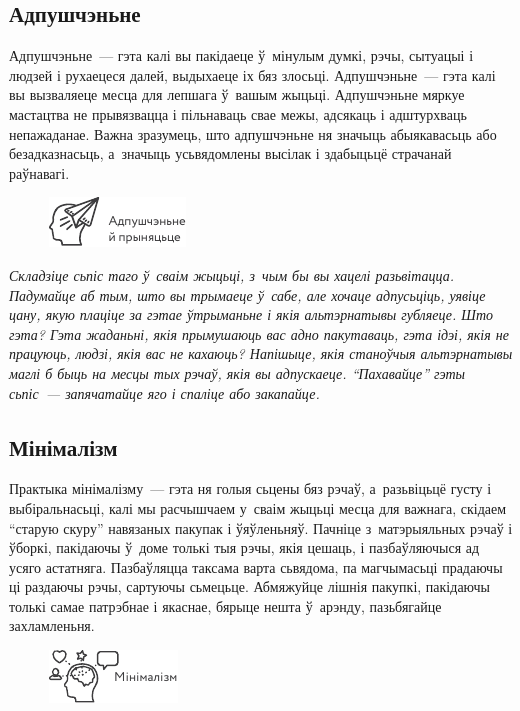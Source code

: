\subsection*{Адпушчэньне}

Адпушчэньне~--- гэта калі вы пакідаеце ў~мінулым думкі, рэчы, сытуацыі і людзей і рухаецеся далей, выдыхаеце іх бяз злосьці. Адпушчэньне~--- гэта калі вы вызваляеце месца для лепшага ў~вашым жыцьці. Адпушчэньне мяркуе мастацтва не прывязвацца і пільнаваць свае межы, адсякаць і адштурхваць непажаданае. Важна зразумець, што адпушчэньне ня значыць абыякавасьць або безадказнасьць, а~значыць усьвядомлены высілак і здабыцьцё страчанай раўнавагі.

\begin{figure}[htb!]
  \centering
  \includegraphics[scale=1.5]{willpower/ch8/15.pdf}
\end{figure}

\emph{Складзіце сьпіс таго ў~сваім жыцьці, з~чым бы вы хацелі разьвітацца. Падумайце аб тым, што вы трымаеце ў~сабе, але хочаце адпусьціць, уявіце цану, якую плаціце за гэтае ўтрыманьне і якія альтэрнатывы губляеце. Што гэта? Гэта жаданьні, якія прымушаюць вас адно пакутаваць, гэта ідэі, якія не працуюць, людзі, якія вас не кахаюць? Напішыце, якія станоўчыя альтэрнатывы маглі б быць на месцы тых рэчаў, якія вы адпускаеце. ``Пахавайце'' гэты сьпіс~--- запячатайце яго і спаліце або закапайце.}

\subsection*{Мінімалізм}

Практыка мінімалізму~--- гэта ня голыя сьцены бяз рэчаў, а~разьвіцьцё густу і выбіральнасьці, калі мы расчышчаем у~сваім жыцьці месца для важнага, скідаем ``старую скуру'' навязаных пакупак і ўяўленьняў. Пачніце з~матэрыяльных рэчаў і ўборкі, пакідаючы ў~доме толькі тыя рэчы, якія цешаць, і пазбаўляючыся ад усяго астатняга. Пазбаўляцца таксама варта сьвядома, па магчымасьці прадаючы ці раздаючы рэчы, сартуючы сьмецьце. Абмяжуйце лішнія пакупкі, пакідаючы толькі самае патрэбнае і якаснае, бярыце нешта ў~арэнду, пазьбягайце захламленьня.

\begin{figure}[htb!]
  \centering
  \includegraphics[scale=1.5]{willpower/ch8/16.pdf}
\end{figure}

